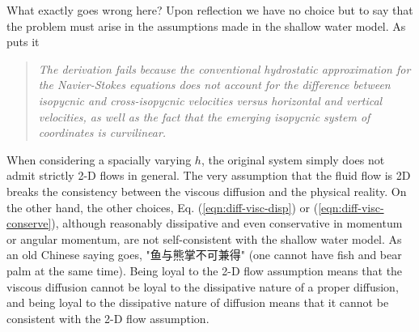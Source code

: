 What exactly goes wrong here? Upon reflection we have no choice but to say that the problem must arise in the assumptions made in the shallow water model. As \textcite{shchepetkin_physically_1996} puts it 
\begin{quotation}
    \textit{The derivation fails because the conventional hydrostatic approximation for the Navier-Stokes equations does not account for the difference between isopycnic and cross-isopycnic velocities versus horizontal and vertical velocities, as well as the fact that the emerging isopycnic system of coordinates is curvilinear.}
\end{quotation}
\begin{CJK*}{UTF8}{gbsn}
When considering a spacially varying $h$, the original system simply does not admit strictly 2-D flows in general. The very assumption that the fluid flow is 2D breaks the consistency between the viscous diffusion and the physical reality. On the other hand, the other choices, Eq. (\ref{eqn:diff-visc-disp}) or (\ref{eqn:diff-visc-conserve}), although reasonably dissipative and even conservative in momentum or angular momentum, are not self-consistent with the shallow water model. As an old Chinese saying goes, "鱼与熊掌不可兼得" (one cannot have fish and bear palm at the same time). Being loyal to the 2-D flow assumption means that the viscous diffusion cannot be loyal to the dissipative nature of a proper diffusion, and being loyal to the dissipative nature of diffusion means that it cannot be consistent with the 2-D flow assumption.
\end{CJK*}

